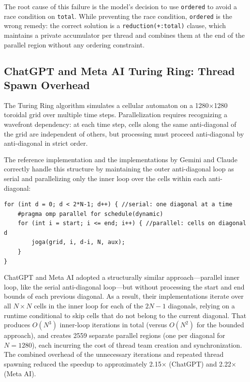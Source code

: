 The root cause of this failure is the model's decision to use \texttt{ordered} to avoid a race condition on \texttt{total}. While preventing the race condition, \texttt{ordered} is the wrong remedy: the correct solution is a \texttt{reduction(+:total)} clause, which maintains a private accumulator per thread and combines them at the end of the parallel region without any ordering constraint.

\subsection{ChatGPT and Meta AI Turing Ring: Thread Spawn Overhead}
\label{subsec:chatgpt_metaai_tr}

The Turing Ring algorithm simulates a cellular automaton on a 1280$\times$1280 toroidal grid over multiple time steps. 
Parallelization requires recognizing a wavefront dependency: at each time step, cells along the same anti-diagonal of the grid are independent of others, but processing must proceed anti-diagonal by anti-diagonal in strict order.

The reference implementation and the implementations by Gemini and Claude correctly handle this structure by maintaining the outer anti-diagonal loop as serial and parallelizing only the inner loop over the cells within each anti-diagonal:

\begin{verbatim}
for (int d = 0; d < 2*N-1; d++) { //serial: one diagonal at a time
    #pragma omp parallel for schedule(dynamic)
    for (int i = start; i <= end; i++) { //parallel: cells on diagonal d
        joga(grid, i, d-i, N, aux);
    }
}
\end{verbatim}

ChatGPT and Meta AI adopted a structurally similar approach—parallel inner loop, like the serial anti-diagonal loop—but without processing the start and end bounds of each previous diagonal. 
As a result, their implementations iterate over all $N \times N$ cells in the inner loop for each of the $2N-1$ diagonals, relying on a runtime conditional to skip cells that do not belong to the current diagonal. 
That produces $O(N^3)$ inner-loop iterations in total (versus $O(N^2)$ for the bounded approach), and creates 2559 separate parallel regions (one per diagonal for $N=1280$), each incurring the cost of thread team creation and synchronization. 
The combined overhead of the unnecessary iterations and repeated thread spawning reduced the speedup to approximately 2.15$\times$ (ChatGPT) and 2.22$\times$ (Meta AI).

